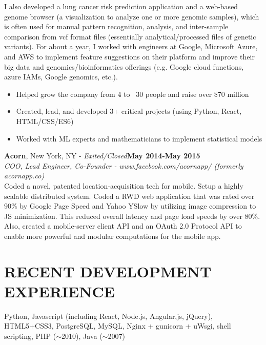 \documentclass[a4paper, 12pt]{article}
\begin{document}
\indent I also developed a lung cancer risk prediction application and a web-based genome browser (a visualization to analyze one or more genomic samples), which is often used for manual pattern recognition, analysis, and inter-sample comparison from vcf format files (essentially analytical/processed files of genetic variants).  For about a year, I worked with engineers at Google, Microsoft Azure, and AWS to implement feature suggestions on their platform and improve their big data and genomics/bioinformatics offerings (e.g. Google cloud functions, azure IAMs, Google genomics, etc.). \\[-6mm]
\begin{itemize}[leftmargin=5mm] 
\itemsep -2pt
	\item Helped grow the company from 4 to ~30 people and raise over \$70 million
	\item Created, lead, and developed 3+ critical projects (using Python, React, HTML/CSS/ES6)
	\item Worked with ML experts and mathematicians to implement statistical models
\end{itemize}
\vspace{0.5mm}
\noindent
{\bf Acorn}{, New York, NY - \sl Exited/Closed}\hfill {\bf May 2014-May 2015 \\}
{\sl COO, Lead Engineer, Co-Founder - www.facebook.com/acornapp/ (formerly acornapp.co)} \\
\indent Coded a novel, patented location-acquisition tech for mobile.  Setup a highly scalable distributed system.  Coded a RWD web application that was rated over 90\% by Google Page Speed and Yahoo YSlow by utilizing image compression to JS minimization.  This reduced overall latency and page load speeds by over 80\%.  Also, created a mobile-server client API and an OAuth 2.0 Protocol API to enable more powerful and modular computations for the mobile app.
                 
\section*{RECENT DEVELOPMENT EXPERIENCE}
\vspace{-3mm}
Python, Javascript (including React, Node.js, Angular.js, jQuery), HTML5+CSS3, PostgreSQL, MySQL, Nginx + gunicorn + uWsgi, shell scripting, PHP ($\sim$2010), Java ($\sim$2007)
                 
\end{document}

